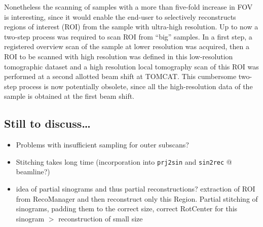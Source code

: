 Nonetheless the scanning of samples with a more than five-fold increase in FOV is interesting, since it would enable the end-user to selectively reconstructs regions of interest (ROI) from the sample with ultra-high resolution. Up to now a two-step process was required to scan ROI from ``big'' samples. In a first step, a registered overview scan of the sample at lower resolution was acquired, then a ROI to be scanned with high resolution was defined in this low-resolution tomographic dataset and a high resolution local tomography scan of this ROI was performed at a second allotted beam shift at TOMCAT. This cumbersome two-step process is now potentially obsolete, since all the high-resolution data of the sample is obtained at the first beam shift.

\subsection{Still to discuss\ldots}
\begin{itemize}
	\item Problems with insufficient sampling for outer subscans?
	\item Stitching takes long time (incorporation into \verb+prj2sin+ and \verb+sin2rec+ @ beamline?)
	\item idea of partial sinograms and thus partial reconstructions? extraction of ROI from RecoManager and then reconstruct only this Region. Partial stitching of sinograms, padding them to the correct size, correct RotCenter for this sinogram $>$ reconstruction of small size
\end{itemize}